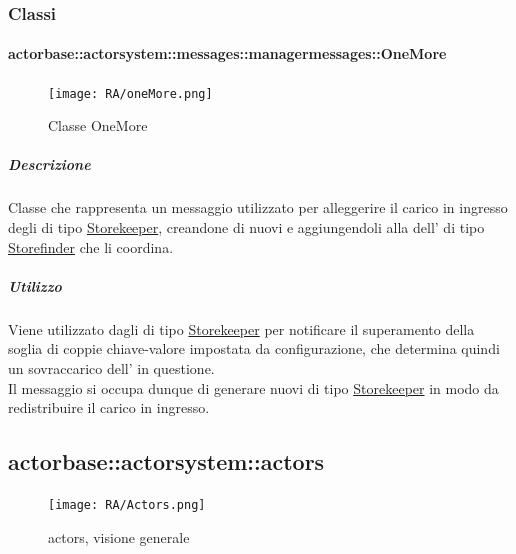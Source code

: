 \documentclass{scalatekids-article}
\begin{document}
\subsubsection{Classi}

\paragraph{actorbase::actorsystem::messages::managermessages::OneMore}

\begin{figure}[H]
  \begin{center}
    \texttt{[image: RA/oneMore.png]}
    \caption{Classe OneMore}
  \end{center}
\end{figure}

\subparagraph{Descrizione}
Classe che rappresenta un messaggio utilizzato per alleggerire il carico in
ingresso degli  di tipo
\hyperref[sec:actorbase::actorsystem::actors::storekeeper::Storekeeper]{Storekeeper},
creandone di nuovi e aggiungendoli alla  dell' di tipo
\hyperref[sec:actorbase::actorsystem::actors::storefinder::Storefinder]{Storefinder}
che li coordina.

\subparagraph{Utilizzo}
Viene utilizzato dagli  di tipo
\hyperref[sec:actorbase::actorsystem::actors::Storekeeper]{Storekeeper} per
notificare il superamento della soglia di coppie chiave-valore impostata da
configurazione, che determina quindi un sovraccarico dell' in
questione.\\ Il messaggio si occupa dunque di generare nuovi  di
tipo
\hyperref[sec:actorbase::actorsystem::actors::storekeeper::Storekeeper]{Storekeeper}
in modo da redistribuire il carico in ingresso.



\subsection{actorbase::actorsystem::actors} %
\label{sec:actorbase::actorsystem::actors}

\begin{figure}[H]
  \begin{center}
    \texttt{[image: RA/Actors.png]}
    \caption{ actors, visione generale}
  \end{center}
\end{figure}
\end{document}
